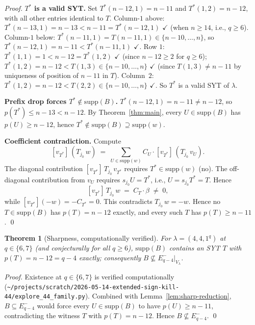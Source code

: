 \documentclass[11pt]{article}
\newtheorem{theorem}{Theorem}
\theoremstyle{definition}
\newcommand{\supp}{\mathrm{supp}}
\begin{document}
\begin{proof}
\medskip\textbf{$T^*$ is a valid SYT.}  Set $T^*(n-12, 1) = n - 11$
and $T^*(1, 2) = n - 12$, with all other entries identical to $T$.
Column-$1$ above: $T^*(n-13, 1) = n - 13 < n - 11 = T^*(n-12, 1)$
$\checkmark$ (when $n \ge 14$, i.e., $q \ge 6$).  Column-$1$ below:
$T^*(n-11, 1) = T(n-11, 1) \in \{n-10, \ldots, n\}$, so $T^*(n-12, 1)
= n - 11 < T^*(n-11, 1)$ $\checkmark$.  Row $1$: $T^*(1, 1) = 1 <
n - 12 = T^*(1, 2)$ $\checkmark$ (since $n - 12 \ge 2$ for $q \ge 6$);
$T^*(1, 2) = n - 12 < T(1, 3) \in \{n-10, \ldots, n\}$ $\checkmark$
(since $T(1, 3) \ne n-11$ by uniqueness of position of $n-11$ in $T$).
Column~$2$: $T^*(1, 2) = n - 12 < T(2, 2) \in \{n-10, \ldots, n\}$
$\checkmark$.  So $T^*$ is a valid SYT of $\lambda$.

\medskip\textbf{Prefix drop forces $T^* \notin \supp(B)$.}
$T^*(n-12, 1) = n - 11 \ne n - 12$, so $p(T^*) \le n - 13 < n - 12$.
By Theorem~\ref{thm:main}, every $U \in \supp(B)$ has $p(U) \ge
n - 12$, hence $T^* \notin \supp(B) \supseteq \supp(w)$.

\medskip\textbf{Coefficient contradiction.}  Compute
\[
   [v_{T^*}]\,(T_{j_0}\,w)
   \;=\; \sum_{U \in \supp(w)} C_U \cdot [v_{T^*}]\,(T_{j_0}\,v_U).
\]
The diagonal contribution $[v_{T^*}]\,T_{j_0}\,v_{T^*}$ requires
$T^* \in \supp(w)$ (no).  The off-diagonal contribution from $v_U$
requires $s_{j_0} U = T^*$, i.e., $U = s_{j_0} T^* = T$.  Hence
\[
   [v_{T^*}]\,T_{j_0}\,w \;=\; C_T \cdot \beta \;\ne\; 0,
\]
while $[v_{T^*}](-w) = -C_{T^*} = 0$.  This contradicts
$T_{j_0}\,w = -w$.  Hence no $T \in \supp(B)$ has $p(T) = n - 12$
exactly, and every such $T$ has $p(T) \ge n - 11$.
\qed
\end{proof}

\begin{theorem}[Sharpness, computationally verified]\label{thm:sharp}
For $\lambda = (4, 4, 1^q)$ at $q \in \{6, 7\}$ (and conjecturally
for all $q \ge 6$), $\supp(B)$ contains an SYT $T$ with $p(T)
= n - 12 = q - 4$ exactly; consequently
$B \not\subseteq E_{q-4}^-|_{V_\lambda}$.
\end{theorem}

\begin{proof}
Existence at $q \in \{6, 7\}$ is verified computationally
(\texttt{\textasciitilde/projects/scratch/2026-05-14-extended-sign-kill-44/explore\_44\_family.py}).
Combined with Lemma~\ref{lem:sharp-reduction}, $B \subseteq E_{q-4}^-$
would force every $U \in \supp(B)$ to have $p(U) \ge n - 11$,
contradicting the witness $T$ with $p(T) = n - 12$.  Hence
$B \not\subseteq E_{q-4}^-$.
\qed
\end{proof}
\end{document}
